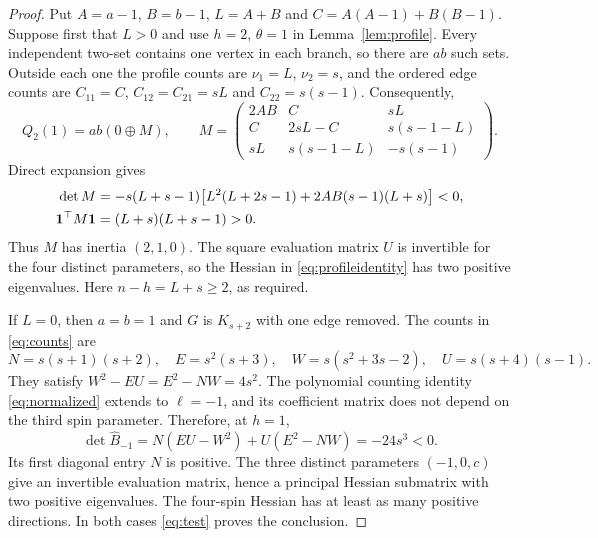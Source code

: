 \documentclass[11pt]{article}
\theoremstyle{remark}
\newcommand{\one}{\mathbf 1}
\begin{document}
\begin{proof}
Put $A=a-1$, $B=b-1$, $L=A+B$ and $C=A(A-1)+B(B-1)$.
Suppose first that $L>0$ and use $h=2$, $\theta=1$ in
Lemma~\ref{lem:profile}. Every independent two-set contains one
vertex in each branch, so there are $ab$ such sets. Outside each
one the profile counts are $\nu_1=L$, $\nu_2=s$, and the ordered
edge counts are $C_{11}=C$, $C_{12}=C_{21}=sL$ and
$C_{22}=s(s-1)$. Consequently,
\begin{equation}
 Q_2(1)=ab(0\oplus M),\qquad
 M=\begin{pmatrix}
 2AB&C&sL\\ C&2sL-C&s(s-1-L)\\
 sL&s(s-1-L)&-s(s-1)
 \end{pmatrix}.                                      \label{eq:twoM}
\end{equation}
Direct expansion gives
\begin{align}
 \det M&=-s(L+s-1)
 \bigl[L^2(L+2s-1)+2AB(s-1)(L+s)\bigr]<0,             \label{eq:twoMdet}\\
 \one^\top M\one&=(L+s)(L+s-1)>0.\notag
\end{align}
Thus $M$ has inertia $(2,1,0)$. The square evaluation matrix $U$
is invertible for the four distinct parameters, so the Hessian in
\eqref{eq:profileidentity} has two positive eigenvalues.
Here $n-h=L+s\geq2$, as required.

If $L=0$, then $a=b=1$ and $G$ is $K_{s+2}$ with one edge removed.
The counts in \eqref{eq:counts} are
\[
 N=s(s+1)(s+2),\quad E=s^2(s+3),\quad
 W=s(s^2+3s-2),\quad U=s(s+4)(s-1).
\]
They satisfy $W^2-EU=E^2-NW=4s^2$. The polynomial counting
identity \eqref{eq:normalized} extends to $\ell=-1$, and its
coefficient matrix does not depend on the third spin parameter.
Therefore, at $h=1$,
\[
 \det\widehat B_{-1}
 =N(EU-W^2)+U(E^2-NW)=-24s^3<0.
\]
Its first diagonal entry $N$ is positive. The three distinct
parameters $(-1,0,c)$ give an invertible evaluation matrix, hence
a principal Hessian submatrix with two positive eigenvalues.
The four-spin Hessian has at least as many positive directions.
In both cases \eqref{eq:test} proves the conclusion.
\end{proof}
\end{document}
